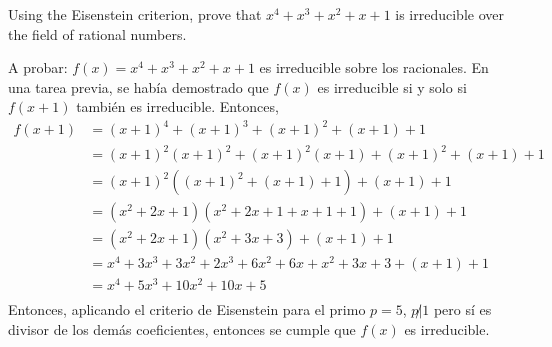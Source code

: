 \begin{problema}[Problema 3]
    Using the Eisenstein criterion, prove that $x^4+x^3+x^2+x+1$ is irreducible over the field of rational numbers.
    \begin{dem}
        A probar: $f(x)=x^4+x^3+x^2+x+1$ es irreducible sobre los racionales. En una tarea previa, se había demostrado que $f(x)$ es irreducible si y solo si $f(x+1)$ también es irreducible. Entonces, 
        \begin{align*}
            f(x+1) &= (x+1)^4+(x+1)^3+(x+1)^2+(x+1)+1\\
                   &= (x+1)^2(x+1)^2 + (x+1)^2(x+1)+(x+1)^2+(x+1)+1\\
                   &= (x+1)^2((x+1)^2+(x+1)+1)+(x+1)+1\\
                   &= (x^2+2x+1)(x^2+2x+1+x+1+1)+(x+1)+1\\
                   &= (x^2+2x+1)(x^2+3x+3)+(x+1)+1\\
                   &= x^4+3x^3+3x^2+2x^3+6x^2+6x+x^2+3x+3+(x+1)+1\\
                   &= x^4+ 5x^3+ 10x^2+10x +5\\
        \end{align*}
        Entonces, aplicando el criterio de Eisenstein para el primo $p=5$, $p\not| 1$ pero sí es divisor de los demás coeficientes, entonces se cumple que $f(x)$ es irreducible. 
    \end{dem}
\end{problema}

